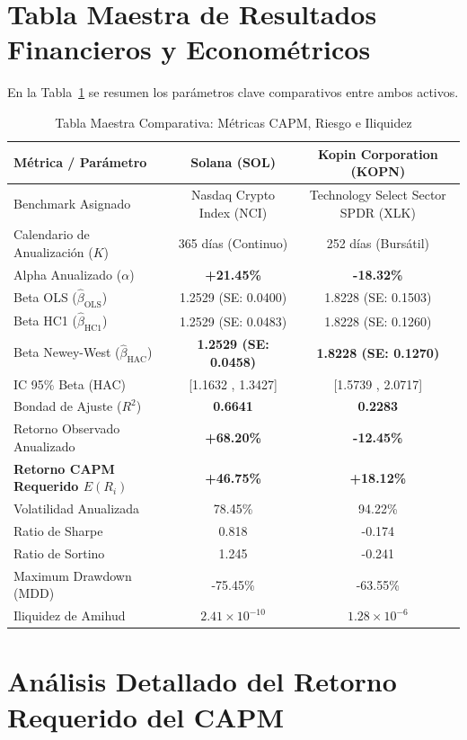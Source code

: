 \documentclass[11pt,a4paper]{article}
\begin{document}
\section{Tabla Maestra de Resultados Financieros y Econométricos}
En la Tabla~\ref{tab:maestra} se resumen los parámetros clave comparativos entre ambos activos.

\begin{table}[H]
\centering
\caption{Tabla Maestra Comparativa: Métricas CAPM, Riesgo e Iliquidez}
\label{tab:maestra}
\small
\begin{tabular}{lcc}
\toprule
\textbf{Métrica / Parámetro} & \textbf{Solana (SOL)} & \textbf{Kopin Corporation (KOPN)} \\
\midrule
Benchmark Asignado & Nasdaq Crypto Index (NCI) & Technology Select Sector SPDR (XLK) \\
Calendario de Anualización ($K$) & 365 días (Continuo) & 252 días (Bursátil) \\
Alpha Anualizado ($\alpha$) & \textbf{+21.45\%} & \textbf{-18.32\%} \\
Beta OLS ($\hat{\beta}_{\text{OLS}}$) & 1.2529 (SE: 0.0400) & 1.8228 (SE: 0.1503) \\
Beta HC1 ($\hat{\beta}_{\text{HC1}}$) & 1.2529 (SE: 0.0483) & 1.8228 (SE: 0.1260) \\
Beta Newey-West ($\hat{\beta}_{\text{HAC}}$) & \textbf{1.2529 (SE: 0.0458)} & \textbf{1.8228 (SE: 0.1270)} \\
IC 95\% Beta (HAC) & [1.1632 , 1.3427] & [1.5739 , 2.0717] \\
Bondad de Ajuste ($R^2$) & \textbf{0.6641} & \textbf{0.2283} \\
Retorno Observado Anualizado & \textbf{+68.20\%} & \textbf{-12.45\%} \\
\textbf{Retorno CAPM Requerido $E(R_i)$} & \textbf{+46.75\%} & \textbf{+18.12\%} \\
Volatilidad Anualizada & 78.45\% & 94.22\% \\
Ratio de Sharpe & 0.818 & -0.174 \\
Ratio de Sortino & 1.245 & -0.241 \\
Maximum Drawdown (MDD) & -75.45\% & -63.55\% \\
Iliquidez de Amihud & $2.41 \times 10^{-10}$ & $1.28 \times 10^{-6}$ \\
\bottomrule
\end{tabular}
\end{table}

\section{Análisis Detallado del Retorno Requerido del CAPM}
\end{document}
